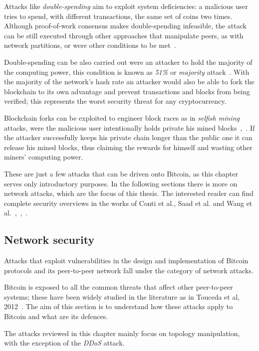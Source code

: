 \documentclass[12pt, letterpaper, twoside]{article}
\begin{document}
Attacks like \textit{double-spending} aim to exploit system deficiencies: a malicious user tries to spend, with different transactions, the same set of coins two times. Although proof-of-work consensus makes double-spending infeasible, the attack can be still executed through other approaches that manipulate peers, as with network partitions, or were other conditions to be met~\cite{doublespendfastpay}.

Double-spending can be also carried out were an attacker to hold the majority of the computing power, this condition is known as \textit{51\%} or \textit{majority} attack~\cite{51atk}. With the majority of the network's hash rate an attacker would also be able to fork the blockchain to its own advantage and prevent transactions and blocks from being verified; this represents the worst security threat for any cryptocurrency.

Blockchain forks can be exploited to engineer block races as in \textit{selfish mining} attacks, were the malicious user intentionally holds private his mined blocks~\cite{selfishmining},~\cite{leelavimolsilp2018selfish}. If the attacker successfully keeps his private chain longer than the public one it can release his mined blocks, thus claiming the rewards for himself and wasting other miners' computing power.

These are just a few attacks that can be driven onto Bitcoin, as this chapter serves only introductory purposes. In the following sections there is more on network attacks, which are the focus of this thesis. The interested reader can find complete security overviews in the works of Conti et al., Saad et al. and Wang et al.~\cite{completeattacksurvey},~\cite{saad2019attacksurface},~\cite{secpermissionlessblock}.

\subsection{Network security}\label{sec:netsec}
Attacks that exploit vulnerabilities in the design and implementation of Bitcoin protocols and its peer-to-peer network fall under the category of network attacks.

Bitcoin is exposed to all the common threats that affect other peer-to-peer systems; these have been widely studied in the literature as in Touceda et al, 2012~\cite{toucedafakeboot}. The aim of this section is to understand how these attacks apply to Bitcoin and what are its defences.

The attacks reviewed in this chapter mainly focus on topology manipulation, with the exception of the \emph{DDoS} attack.
\end{document}
